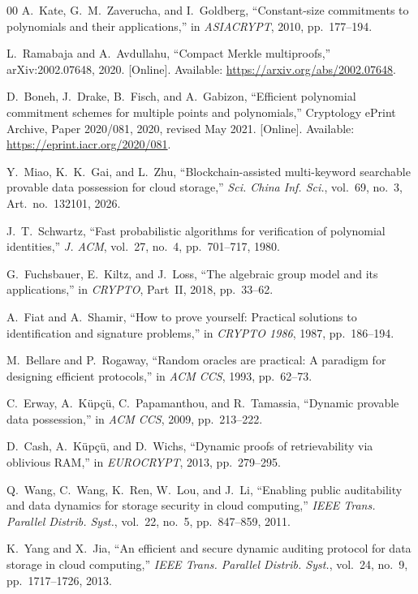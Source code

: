 \documentclass[lettersize,journal]{IEEEtran}
\begin{document}
\begin{thebibliography}{00}
A.~Kate, G.~M.~Zaverucha, and I.~Goldberg,
``Constant-size commitments to polynomials and their applications,''
in \emph{ASIACRYPT}, 2010, pp.~177--194.

L.~Ramabaja and A.~Avdullahu,
``Compact Merkle multiproofs,''
arXiv:2002.07648, 2020. [Online]. Available: \url{https://arxiv.org/abs/2002.07648}.

D.~Boneh, J.~Drake, B.~Fisch, and A.~Gabizon,
``Efficient polynomial commitment schemes for multiple points and polynomials,''
Cryptology ePrint Archive, Paper 2020/081, 2020, revised May 2021. [Online]. Available: \url{https://eprint.iacr.org/2020/081}.

Y.~Miao, K.~K.~Gai, and L.~Zhu,
``Blockchain-assisted multi-keyword searchable provable data possession for cloud storage,''
\emph{Sci. China Inf. Sci.}, vol.~69, no.~3, Art.~no.~132101, 2026.

J.~T.~Schwartz,
``Fast probabilistic algorithms for verification of polynomial identities,''
\emph{J. ACM}, vol.~27, no.~4, pp.~701--717, 1980.

G.~Fuchsbauer, E.~Kiltz, and J.~Loss,
``The algebraic group model and its applications,''
in \emph{CRYPTO}, Part~II, 2018, pp.~33--62.

A.~Fiat and A.~Shamir,
``How to prove yourself: Practical solutions to identification and signature problems,''
in \emph{CRYPTO 1986}, 1987, pp.~186--194.

M.~Bellare and P.~Rogaway,
``Random oracles are practical: A paradigm for designing efficient protocols,''
in \emph{ACM CCS}, 1993, pp.~62--73.

C.~Erway, A.~K{\"u}p{\c{c}}{\"u}, C.~Papamanthou, and R.~Tamassia,
``Dynamic provable data possession,''
in \emph{ACM CCS}, 2009, pp.~213--222.

D.~Cash, A.~K{\"u}p{\c{c}}{\"u}, and D.~Wichs,
``Dynamic proofs of retrievability via oblivious RAM,''
in \emph{EUROCRYPT}, 2013, pp.~279--295.

Q.~Wang, C.~Wang, K.~Ren, W.~Lou, and J.~Li,
``Enabling public auditability and data dynamics for storage security in cloud computing,''
\emph{IEEE Trans. Parallel Distrib. Syst.}, vol.~22, no.~5, pp.~847--859, 2011.

K.~Yang and X.~Jia,
``An efficient and secure dynamic auditing protocol for data storage in cloud computing,''
\emph{IEEE Trans. Parallel Distrib. Syst.}, vol.~24, no.~9, pp.~1717--1726, 2013.


\end{thebibliography}
\end{document}
